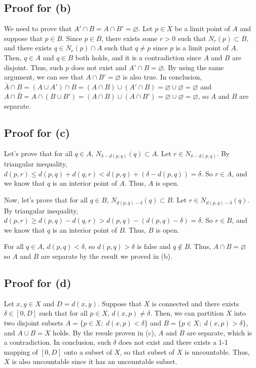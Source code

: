 \documentclass{scrartcl}
\begin{document}
\subsection{Proof for (b)}
We need to prove that \(A' \cap B = A \cap B' = \varnothing\).
Let \(p \in X\) be a limit point of \(A\) and suppose that \(p \in B\).
Since \(p \in B\), there exists some \(r > 0\) such that \(N_r(p) \subset B\), and there exists \(q \in N_r(p) \cap A\) such that \(q \not = p\) since \(p\) is a limit point of \(A\).
Then, \(q \in A\) and \(q \in B\) both holds, and it is a contradiction since \(A\) and \(B\) are disjoint.
Thus, such \(p\) does not exist and \(A' \cap B = \varnothing\).
By using the same argument, we can see that \(A \cap B' = \varnothing\) is also true.
In conclusion, \(\bar{A} \cap B = (A \cup A') \cap B = (A \cap B) \cup (A' \cap B) = \varnothing \cup \varnothing = \varnothing\) and \(A \cap \bar{B} = A \cap (B \cup B') = (A \cap B) \cup (A \cap B') = \varnothing \cup \varnothing = \varnothing\), so \(A\) and \(B\) are separate.

\subsection{Proof for (c)}
Let's prove that for all \(q \in A\), \(N_{\delta - d(p, q)}(q) \subset A\).
Let \(r \in N_{\delta - d(p, q)}\).
By triangular inequality, \(d(p, r) \leq d(p, q) + d(q, r) < d(p, q) + (\delta - d(p, q)) = \delta\).
So \(r \in A\), and we know that \(q\) is an interior point of \(A\).
Thus, \(A\) is open.

Now, let's prove that for all \(q \in B\), \(N_{d(p, q) - \delta}(q) \subset B\).
Let \(r \in N_{d(p, q) - \delta}(q)\).
By triangular inequality, \(d(p, r) \geq d(p, q) - d(q, r) > d(p, q) - (d(p, q) - \delta) = \delta\).
So \(r \in B\), and we know that \(q\) is an interior point of \(B\).
Thus, \(B\) is open.

For all \(q \in A\), \(d(p, q) < \delta\), so \(d(p, q) > \delta\) is false and \(q \not \in B\).
Thus, \(A \cap B = \varnothing\) so \(A\) and \(B\) are separate by the result we proved in (b).

\subsection{Proof for (d)}
Let \(x, y \in X\) and \(D = d(x, y)\).
Suppose that \(X\) is connected and there exists \(\delta \in [0, D]\) such that for all \(p \in X\), \(d(x, p) \not = \delta\).
Then, we can partition \(X\) into two disjoint subsets \(A = \{p \in X;\; d(x, p) < \delta\}\) and \(B = \{p \in X;\; d(x, p) > \delta\}\), and \(A \cup B = X\) holds.
By the resule proven in (c), \(A\) and \(B\) are separate, which is a contradiction.
In conclusion, such \(\delta\) does not exist and there exists a 1-1 mapping of \([0, D]\) onto a subset of \(X\), so that subset of \(X\) is uncountable.
Thus, \(X\) is also uncountable since it has an uncountable subset.
\end{document}
